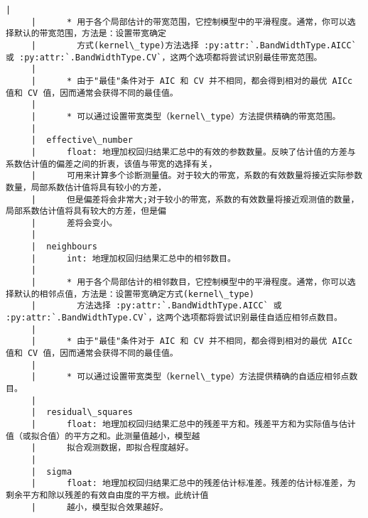 \documentclass[11pt]{article}
\begin{document}
\begin{Verbatim}[commandchars=\\\{\}]
     |      
     |      * 用于各个局部估计的带宽范围，它控制模型中的平滑程度。通常，你可以选择默认的带宽范围，方法是：设置带宽确定
     |        方式(kernel\_type)方法选择 :py:attr:`.BandWidthType.AICC` 或 :py:attr:`.BandWidthType.CV`，这两个选项都将尝试识别最佳带宽范围。
     |      
     |      * 由于"最佳"条件对于 AIC 和 CV 并不相同，都会得到相对的最优 AICc 值和 CV 值，因而通常会获得不同的最佳值。
     |      
     |      * 可以通过设置带宽类型（kernel\_type）方法提供精确的带宽范围。
     |  
     |  effective\_number
     |      float: 地理加权回归结果汇总中的有效的参数数量。反映了估计值的方差与系数估计值的偏差之间的折衷，该值与带宽的选择有关，
     |      可用来计算多个诊断测量值。对于较大的带宽，系数的有效数量将接近实际参数数量，局部系数估计值将具有较小的方差，
     |      但是偏差将会非常大;对于较小的带宽，系数的有效数量将接近观测值的数量，局部系数估计值将具有较大的方差，但是偏
     |      差将会变小。
     |  
     |  neighbours
     |      int: 地理加权回归结果汇总中的相邻数目。
     |      
     |      * 用于各个局部估计的相邻数目，它控制模型中的平滑程度。通常，你可以选择默认的相邻点值，方法是：设置带宽确定方式(kernel\_type)
     |        方法选择 :py:attr:`.BandWidthType.AICC` 或 :py:attr:`.BandWidthType.CV`，这两个选项都将尝试识别最佳自适应相邻点数目。
     |      
     |      * 由于"最佳"条件对于 AIC 和 CV 并不相同，都会得到相对的最优 AICc 值和 CV 值，因而通常会获得不同的最佳值。
     |      
     |      * 可以通过设置带宽类型（kernel\_type）方法提供精确的自适应相邻点数目。
     |  
     |  residual\_squares
     |      float: 地理加权回归结果汇总中的残差平方和。残差平方和为实际值与估计值（或拟合值）的平方之和。此测量值越小，模型越
     |      拟合观测数据，即拟合程度越好。
     |  
     |  sigma
     |      float: 地理加权回归结果汇总中的残差估计标准差。残差的估计标准差，为剩余平方和除以残差的有效自由度的平方根。此统计值
     |      越小，模型拟合效果越好。
    

\end{Verbatim}
\end{document}
